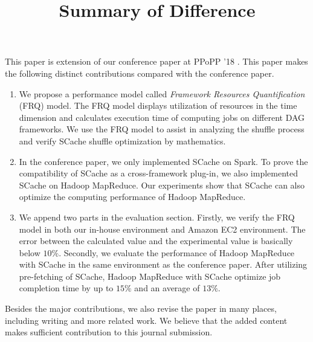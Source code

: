 \documentclass [14pt,journal,compsoc]{article}
\begin{document}
\title{Summary of Difference}
\maketitle

This paper is extension of our conference paper at PPoPP '18 \cite{fu2018efficient}. 
This paper makes the following distinct contributions compared with the conference paper.

\begin{enumerate}
\item 
We propose a performance model called \textit{Framework Resources Quantification} (FRQ) model. The FRQ model displays utilization of resources in the time dimension and calculates execution time of computing jobs on different DAG frameworks. We use the FRQ model to assist in analyzing the shuffle process and verify SCache shuffle optimization by mathematics.  
\item 
In the conference paper, we only implemented SCache on Spark. To prove the compatibility of SCache as a cross-framework plug-in, we also implemented SCache on Hadoop MapReduce. 
Our experiments show that SCache can also optimize the computing performance of Hadoop MapReduce.
\item
We append two parts in the evaluation section. Firstly, we verify the FRQ model in both our in-house environment and Amazon EC2 environment. The error between the calculated value and the experimental value is basically below $10\%$. Secondly, we evaluate the performance of Hadoop MapReduce with SCache in the same environment as the conference paper.
After utilizing pre-fetching of SCache, Hadoop MapReduce with SCache optimize job completion time by up to $15\%$ and an average of $13\%$.
\end{enumerate}

Besides the major contributions, we also revise the paper in many places, including writing and more related work. We believe that the added content makes sufficient contribution to this journal submission.



\end{document}
